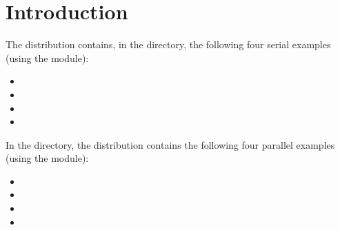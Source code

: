 \section{Introduction}\label{s:ex_intro}

The {\ida} distribution contains, in the 
directory, the following four serial examples (using the {\nvecs} module):
\begin{itemize}
\item {}
\item {}
\item {}
\item {}
\end{itemize}

\noindent In the  directory, the {\ida} 
distribution contains the following four parallel examples 
(using the {\nvecp} module):
\begin{itemize}
\item {}
\item {}
\item {}
\item {}
\end{itemize}

